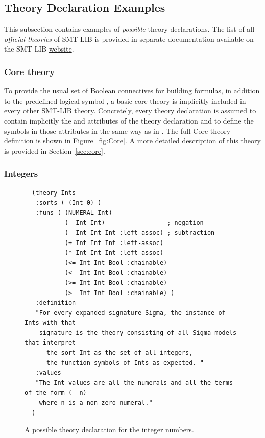 \subsection{Theory Declaration Examples} \label{sec:theory-examples}

This subsection contains examples of \emph{possible} theory declarations.
The list of all \emph{official theories} of SMT-LIB is provided in separate
documentation available on the SMT-LIB \href{https://www.smt-lib.org}{website}. 

\subsubsection*{Core theory}

To provide the usual set of Boolean connectives for building formulas,
in addition to the predefined logical symbol ,
a basic core theory is implicitly included in every other SMT-LIB theory.
Concretely, every theory declaration is assumed 
to contain implicitly the  and  attributes 
of the  theory declaration and 
to define the symbols in those attributes in the same way as in .
The full Core theory definition is shown in Figure~\ref{fig:Core}.
A more detailed description of this theory is provided in Section~\ref{sec:core}.


\subsubsection*{Integers}

\begin{figure}[t]
  \small
  {\color{NavyBlue}
  \begin{verbatim}
  (theory Ints
   :sorts ( (Int 0) )
   :funs ( (NUMERAL Int) 
           (- Int Int)                 ; negation
           (- Int Int Int :left-assoc) ; subtraction
           (+ Int Int Int :left-assoc) 
           (* Int Int Int :left-assoc)
           (<= Int Int Bool :chainable)
           (<  Int Int Bool :chainable)
           (>= Int Int Bool :chainable)
           (>  Int Int Bool :chainable) )
   :definition 
   "For every expanded signature Sigma, the instance of Ints with that
    signature is the theory consisting of all Sigma-models that interpret 
    - the sort Int as the set of all integers,
    - the function symbols of Ints as expected. "
   :values 
   "The Int values are all the numerals and all the terms of the form (- n)
    where n is a non-zero numeral." 
  )
  \end{verbatim}
  }
  \caption{A possible theory declaration for the integer numbers.}
  \label{fig:Integers}
\end{figure}
  
